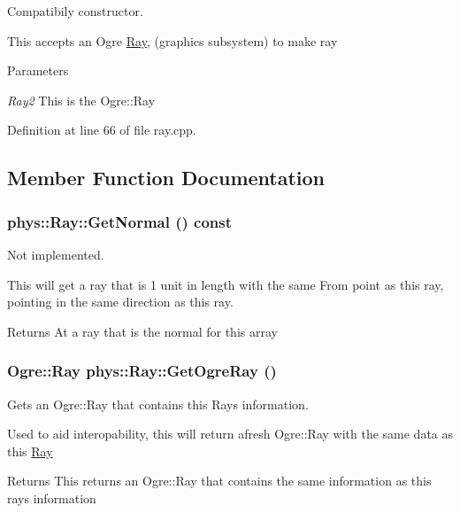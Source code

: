 Compatibily constructor. 

This accepts an Ogre \hyperlink{classphys_1_1Ray}{Ray}, (graphics subsystem) to make ray 
\begin{DoxyParams}{Parameters}
\item[{\em Ray2}]This is the Ogre::Ray \end{DoxyParams}


Definition at line 66 of file ray.cpp.



\subsection{Member Function Documentation}
\hypertarget{classphys_1_1Ray_a7445c25acb6ce865ef85e7ada829ccba}{
\subsubsection[{GetNormal}]{ phys::Ray::GetNormal () const}}
\label{df/d57/classphys_1_1Ray_a7445c25acb6ce865ef85e7ada829ccba}


Not implemented. 

This will get a ray that is 1 unit in length with the same From point as this ray, pointing in the same direction as this ray. \begin{DoxyReturn}{Returns}
At a ray that is the normal for this array 
\end{DoxyReturn}
\hypertarget{classphys_1_1Ray_a21fbd19de94f238998930213ab72622a}{
\subsubsection[{GetOgreRay}]{\setlength{\rightskip}{0pt plus 5cm}Ogre::Ray phys::Ray::GetOgreRay ()}}
\label{df/d57/classphys_1_1Ray_a21fbd19de94f238998930213ab72622a}


Gets an Ogre::Ray that contains this Rays information. 

Used to aid interopability, this will return afresh Ogre::Ray with the same data as this \hyperlink{classphys_1_1Ray}{Ray} \begin{DoxyReturn}{Returns}
This returns an Ogre::Ray that contains the same information as this rays information 
\end{DoxyReturn}



